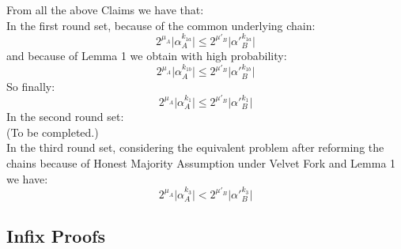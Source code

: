 \documentclass[11pt,a4paper]{article}
\begin{document}

From all the above Claims we have that:\\
In the first round set, because of the common underlying chain:
\begin{equation*}
2^{\mu_A} \vert \alpha_A^{k_{1a}} \vert \leq 2^{\mu'_B} \vert \alpha'{_B^{k_{1a}}} \vert
\end{equation*}
and because of Lemma 1 we obtain with high probability:
\begin{equation*} 
2^{\mu_A} \vert \alpha_A^{k_{1b}} \vert \leq 2^{\mu'_B} \vert \alpha'{_B^{k_{1b}}} \vert
\end{equation*}
So finally:
\begin{equation} \label{eq_v_round_set_1}
2^{\mu_A} \vert \alpha_A^{k_1} \vert \leq 2^{\mu'_B} \vert \alpha'{_B^{k_1}} \vert
\end{equation}
In the second round set:\\
(To be completed.)\\
In the third round set, considering the equivalent problem after reforming the chains because of Honest Majority Assumption under Velvet Fork and Lemma 1 we have:
\begin{equation} \label{eq_v_round_set_3}
2^{\mu_A} \vert \alpha_A^{k_3} \vert < 2^{\mu'_B} \vert \alpha'{_B^{k_3}} \vert
\end{equation}

\subsection{Infix Proofs}

\end{document}

